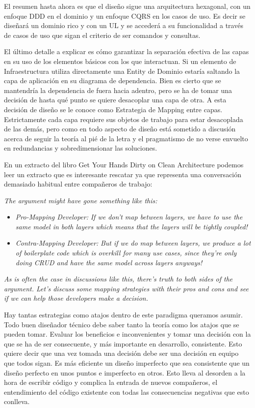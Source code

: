 El resumen hasta ahora es que el diseño sigue una arquitectura hexagonal, con un enfoque DDD en el dominio y un enfoque CQRS en los casos de uso. Es decir se diseñará un dominio rico y con un UL y se accederá a su funcionalidad a través de casos de uso que sigan el criterio de ser comandos y consultas.

El último detalle a explicar es cómo garantizar la separación efectiva de las capas en su uso de los elementos básicos con los que interactuan. Si un elemento de Infraestructura utiliza directamente una Entity de Dominio estaría saltando la capa de aplicación en su diagrama de dependencia. Bien es cierto que se mantendría la dependencia de fuera hacia adentro, pero se ha de tomar una decisión de hasta qué punto se quiere desacoplar una capa de otra. A esta decisión de diseño se le conoce como Estrategia de Mapping entre capas. Estrictamente cada capa requiere sus objetos de trabajo para estar desacoplada de las demás, pero como en todo aspecto de diseño está sometido a discusión acerca de seguir la teoría al pié de la letra y el pragmatismo de no verse envuelto en redundancias y sobredimensionar las soluciones.

En un extracto del libro Get Your Hands Dirty on Clean Architecture\cite{TomHombergs2019GYHD} podemos leer un extracto que es interesante rescatar ya que representa una conversación demasiado habitual entre compañeros de trabajo:

\textit{ The argument might have gone something like this:}

\begin{itemize}
    \item \textit{Pro-Mapping Developer:}
    \subitem  \textit{ If we don’t map between layers, we have to use the same model in both layers which means that the layers will be tightly coupled!}
    \item \textit{Contra-Mapping Developer:}
    \subitem \textit{ But if we do map between layers, we produce a lot of boilerplate code which is overkill for many use cases, since they’re only doing CRUD and have the same model across layers anyways!}
\end{itemize}
\textit{As is often the case in discussions like this, there’s truth to both sides of the argument. Let’s discuss some mapping strategies with their pros and cons and see if we can help those developers make a decision.}

Hay tantas estrategias como atajos dentro de este paradigma queramos asumir. Todo buen diseñador técnico debe saber tanto la teoría como los atajos que se pueden tomar. Evaluar los beneficios e inconvenientes y tomar una decisión con la que se ha de ser consecuente, y más importante en desarrollo, consistente. Esto quiere decir que una vez tomada una decisión debe ser una decisión en equipo que todos sigan. Es más eficiente un diseño imperfecto que sea consistente que un diseño perfecto en unos puntos e imperfecto en otros. Esto lleva al desorden a la hora de escribir código y complica la entrada de nuevos compañeros, el entendimiento del código existente con todas las consecuencias negativas que esto conlleva.

